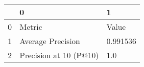 \begin{tabular}{lll}
\toprule
{} &                       0 &         1 \\
\midrule
0 &                  Metric &     Value \\
1 &       Average Precision &  0.991536 \\
2 &  Precision at 10 (P@10) &       1.0 \\
\bottomrule
\end{tabular}
